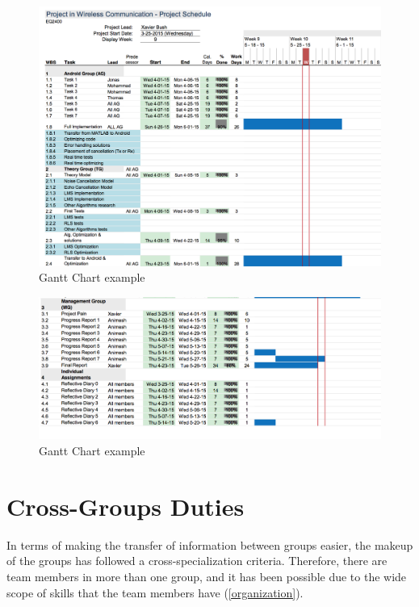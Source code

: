 \documentclass[11pt,a4paper,english]{book}  %
\theoremstyle{definition}  %
\theoremstyle{plain}  %
\theoremstyle{remark}  %
\begin{document}
		\begin{figure}[h]
		\centering
		\includegraphics[width=15cm]{images/management/ganttchart1.jpg}
		\caption{Gantt Chart example}
		\label{fig:gantt1}
		\end{figure}

		\begin{figure}[h]
		\centering
		\includegraphics[width=15cm]{images/management/ganttchart2.jpg}
		\caption{Gantt Chart example}
		\label{fig:gantt2}
		\end{figure}


\section{Cross-Groups Duties}

In terms of making the transfer of information between groups easier, the makeup of the groups has followed a cross-specialization criteria. Therefore, there are team members in more than one group, and it has been possible due to the wide scope of skills that the team members have (\ref{organization}).
\end{document}
